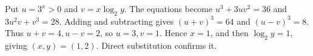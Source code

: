 Put $u=3^x>0$ and $v=x\log_2y$. The equations become $u^3+3uv^2=36$ and $3u^2v+v^3=28$. Adding and subtracting gives $(u+v)^3=64$ and $(u-v)^3=8$. Thus $u+v=4,u-v=2$, so $u=3,v=1$. Hence $x=1$, and then $\log_2y=1$, giving $\boxed{(x,y)=(1,2)}$. Direct substitution confirms it.
